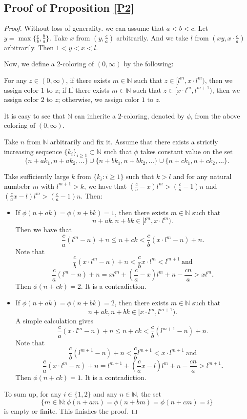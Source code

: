 \documentclass[reqno,12pt]{amsart}
\def \N {\mathbb N}
\numberwithin{equation}{section}
\begin{document}
\subsection{Proof of Proposition \ref{P2}}
\begin{proof}
	Without loss of generality. we can assume that $a<b<c$. Let $y=\max\{\frac{c}{b},\frac{b}{a}\}$. Take $x$ from  $(y,\frac{c}{a})$ arbitrarily. And we take $l$ from $(xy,x\cdot\frac{c}{a})$ arbitrarily. Then $1<y<x<l$.
	
	Now, we define a $2$-coloring of $(0,\infty)$ by the following:
	
	For any $z\in (0,\infty)$, if there exists $m\in \N$ such that $z\in [l^{m},x\cdot l^{m})$, then we assign color $1$ to $z$; if If there exists $m\in \N$ such that $z\in [x\cdot l^{m},l^{m+1})$, then we assign color $2$ to $z$; otherwise, we assign color $1$ to $z$.
	
	It is easy to see that $\N$ can inherite a $2$-coloring, denoted by $\phi$, from the above coloring of $(0,\infty)$.
	
		Take $n$ from $\N$ arbitrarily and fix it. Assume that there exists a strictly increasing sequence $\{k_i\}_{i\ge 1}\subset \N$ such that $\phi$ takes constant value on the set $$\{n+ak_1,n+ak_2,\ldots\}\cup \{n+bk_1,n+bk_2,\ldots\}\cup \{n+ck_1,n+ck_2,\ldots\}.$$
		
		Take sufficiently large $k$ from $\{k_i:i\ge 1\}$ such that $k>l$ and for any natural numbebr $m$ with $l^{m+1}>k$, we have that $(\frac{c}{a}-x)l^m>(\frac{c}{a}-1)n$ and  $(\frac{c}{a}x-l)l^m>(\frac{c}{a}-1)n$. Then:
		\begin{itemize}
			\item If $\phi(n+ak)=\phi(n+bk)=1$, then there exists $m\in \N$ such that $$n+ak,n+bk\in [l^{m},x\cdot l^{m}).$$
		   	Then we have that $$\frac{c}{a   }(l^{m}-n)+n\le n+ck<\frac{c}{b}(x\cdot l^{m}-n)+n.$$ Note that $$\frac{c}{b}(x\cdot l^{m}-n)+n<\frac{c}{b}x\cdot l^{m}<l^{m+1}\ \text{and}$$ $$\frac{c}{a   }(l^{m}-n)+n=xl^{m}+(\frac{c}{a}-x)l^{m}+n-\frac{cn}{a}>xl^{m}.$$ Then $\phi(n+ck)=2$. It is a contradiction.
			\item If $\phi(n+ak)=\phi(n+bk)=2$, then there exists $m\in \N$ such that $$n+ak,n+bk\in [x\cdot l^{m},l^{m+1}).$$ A simple calculation gives $$\frac{c}{a}(x\cdot l^{m}-n)+n\le n+ck<\frac{c}{b}(l^{m+1}-n)+n.$$
			Note that  $$\frac{c}{b}(l^{m+1}-n)+n<\frac{c}{b}l^{m+1}<x\cdot l^{m+1}\ \text{and}$$ $$\frac{c}{a}(x\cdot l^{m}-n)+n=l^{m+1}+(\frac{c}{a}x-l)l^{m}+n-\frac{cn}{a}>l^{m+1}.$$ Then $\phi(n+ck)=1$. It is a contradiction.
		\end{itemize}
		To sum up, for any $i\in \{1,2\}$ and any $n\in \N$, the set $$\{m\in \N:\phi(n+am)=\phi(n+bm)=\phi(n+cm)=i\}$$ is empty or finite. This finishes the proof.
\end{proof}
\end{document}
